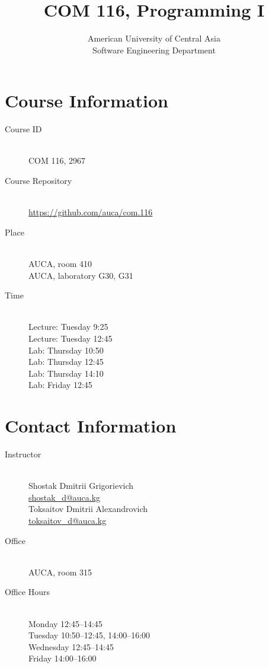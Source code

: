 \documentclass[12pt,a4paper,oneside]{article}
\begin{document}
    \title{COM 116, Programming I}
    \author{
        American University of Central Asia\\
        Software Engineering Department
    }
    \date{}
    \maketitle

    \section{Course Information}

        \begin{description}
            \item[Course ID]\hfill\\
                COM 116, 2967
            \item[Course Repository]\hfill\\
                \url{https://github.com/auca/com.116}
            \item[Place]\hfill\\
                AUCA, room 410\\
                AUCA, laboratory G30, G31
            \item[Time]\hfill\\
                Lecture: Tuesday 9:25\\
                Lecture: Tuesday 12:45\\
                Lab: Thursday 10:50\\
                Lab: Thursday 12:45\\
                Lab: Thursday 14:10\\
                Lab: Friday 12:45
        \end{description}

    \section{Contact Information}

        \begin{description}
            \item[Instructor]\hfill\\
                Shostak Dmitrii Grigorievich\\
                \href{mailto:shostak_d@auca.kg}{shostak\_d@auca.kg}\\
                Toksaitov Dmitrii Alexandrovich\\
                \href{mailto:toksaitov_d@auca.kg}{toksaitov\_d@auca.kg}
            \item[Office]\hfill\\
                AUCA, room 315
            \item[Office Hours]\hfill\\
                Monday 12:45--14:45\\
                Tuesday 10:50--12:45, 14:00--16:00\\
                Wednesday 12:45--14:45\\
                Friday 14:00--16:00
        \end{description}
\end{document}
